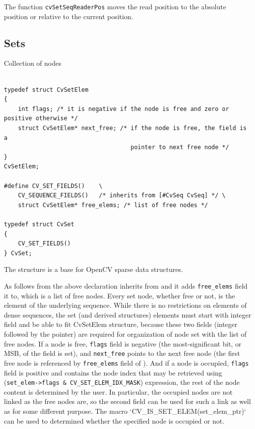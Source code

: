 The function \texttt{cvSetSeqReaderPos} moves the read position to the absolute position or relative to the current position.

\subsection{Sets}

\label{CvSet}

Collection of nodes

\begin{lstlisting}

typedef struct CvSetElem
{
    int flags; /* it is negative if the node is free and zero or positive otherwise */
    struct CvSetElem* next_free; /* if the node is free, the field is a
                                    pointer to next free node */
}
CvSetElem;

#define CV_SET_FIELDS()    \
    CV_SEQUENCE_FIELDS()   /* inherits from [#CvSeq CvSeq] */ \
    struct CvSetElem* free_elems; /* list of free nodes */

typedef struct CvSet
{
    CV_SET_FIELDS()
} CvSet;

\end{lstlisting}

The structure  is a base for OpenCV sparse data structures.

As follows from the above declaration \cross{CvSet} inherits from
 and it adds \texttt{free\_elems} field it to, which
is a list of free nodes. Every set node, whether free or not, is the
element of the underlying sequence. While there is no restrictions on
elements of dense sequences, the set (and derived structures) elements
must start with integer field and be able to fit CvSetElem structure,
because these two fields (integer followed by the pointer) are required
for organization of node set with the list of free nodes. If a node is
free, \texttt{flags} field is negative (the most-significant bit, or
MSB, of the field is set), and \texttt{next\_free} points to the next
free node (the first free node is referenced by \texttt{free\_elems}
field of \cross{CvSet}). And if a node is occupied, \texttt{flags} field
is positive and contains the node index that may be retrieved using
(\texttt{set\_elem->flags \& CV\_SET\_ELEM\_IDX\_MASK}) expression, the rest of
the node content is determined by the user. In particular, the occupied
nodes are not linked as the free nodes are, so the second field can be
used for such a link as well as for some different purpose. The macro
`CV\_IS\_SET\_ELEM(set\_elem\_ptr)` can be used to determined whether
the specified node is occupied or not.

